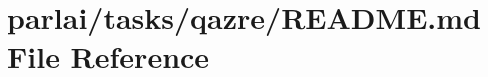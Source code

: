 \hypertarget{parlai_2tasks_2qazre_2README_8md}{}\section{parlai/tasks/qazre/\+R\+E\+A\+D\+ME.md File Reference}
\label{parlai_2tasks_2qazre_2README_8md}
